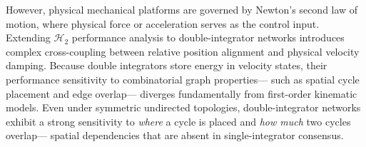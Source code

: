 However, physical mechanical platforms are governed by Newton's second law of motion, where physical force or acceleration serves as the control input. Extending $\mathcal{H}_2$ performance analysis to double-integrator networks introduces complex cross-coupling between relative position alignment and physical velocity damping. Because double integrators store energy in velocity states, their performance sensitivity to combinatorial graph properties— such as spatial cycle placement and edge overlap— diverges fundamentally from first-order kinematic models. Even under symmetric undirected topologies, double-integrator networks exhibit a strong sensitivity to \emph{where} a cycle is placed and \emph{how much} two cycles overlap— spatial dependencies that are absent in single-integrator consensus.


